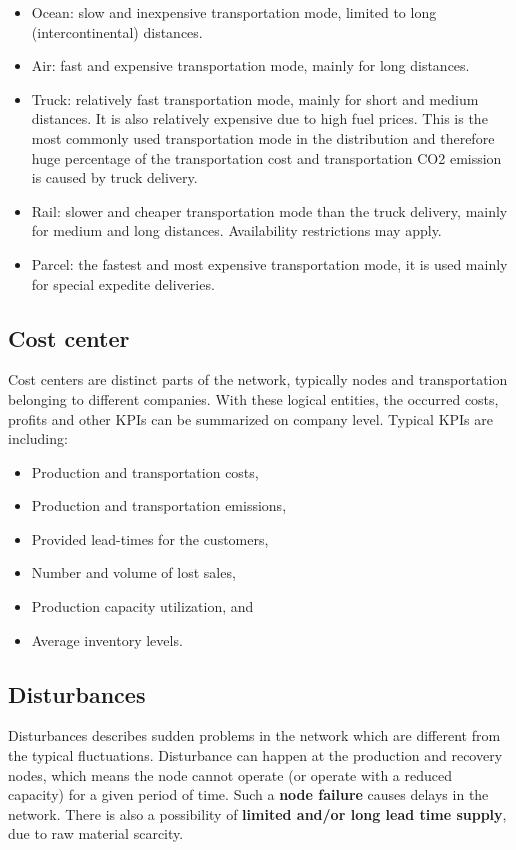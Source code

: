 \documentclass{article}
\begin{document}
\begin{itemize}
\item Ocean: slow and inexpensive transportation mode, limited to long (intercontinental) distances.
\item Air: fast and expensive transportation mode, mainly for long distances.
\item Truck: relatively fast transportation mode, mainly for short and medium distances. It is also relatively expensive due to high fuel prices. This is the most commonly used transportation mode in the distribution and therefore huge percentage of the transportation cost and transportation CO2 emission is caused by truck delivery.
\item Rail: slower and cheaper transportation mode than the truck delivery, mainly for medium and long distances. Availability restrictions may apply.
\item Parcel: the fastest and most expensive transportation mode, it is used mainly for special expedite deliveries.
\end{itemize}

\subsection{Cost center}

Cost centers are distinct parts of the network, typically nodes and transportation belonging to different companies. With these logical entities, the occurred costs, profits and other KPIs can be summarized on company level. Typical KPIs are including:

\begin{itemize}
\item Production and transportation costs,
\item Production and transportation emissions,
\item Provided lead-times for the customers,
\item Number and volume of lost sales,
\item Production capacity utilization, and
\item Average inventory levels.
\end{itemize}


\subsection{Disturbances}

Disturbances describes sudden problems in the network which are different from the typical fluctuations. Disturbance can happen at the production and recovery nodes, which means the node cannot operate (or operate with a reduced capacity) for a given period of time. Such a \textbf{node failure} causes delays in the network. There is also a possibility of \textbf{limited and/or long lead time supply}, due to raw material scarcity.
\end{document}
